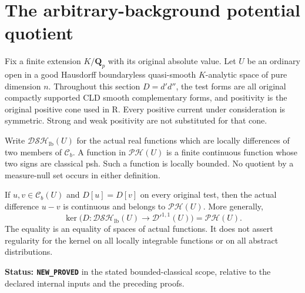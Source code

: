 \section{The arbitrary-background potential quotient}
\label{sec:r5-arbitrary-background-quotient}

Fix a finite extension $K/\mathbf Q_p$ with its original absolute
value. Let $U$ be an ordinary open in a good Hausdorff boundaryless
quasi-smooth $K$-analytic space of pure dimension $n$.
Throughout this section $D=d'd''$, the test forms are all original
compactly supported CLD smooth complementary forms, and positivity
is the original positive cone used in R. Every positive current
under consideration is symmetric. Strong and weak positivity are
not substituted for that cone.

Write $\mathscr{DSH}_{\mathrm{lb}}(U)$ for the actual real functions
which are locally differences of two members of $\mathcal C_b$.
A function in $\mathscr{PH}(U)$ is a finite continuous function
whose two signs are classical psh. Such a function is locally
bounded. No quotient by a measure-null set occurs in either
definition.

\begin{theorem}
\label{thm:r5-bounded-kernel-regularity}
If $u,v\in\mathcal C_b(U)$ and $D[u]=D[v]$ on every original
test, then the actual difference $u-v$ is continuous and belongs
to $\mathscr{PH}(U)$. More generally,
\[
 \ker\bigl(D:\mathscr{DSH}_{\mathrm{lb}}(U)
                   \longrightarrow\mathcal D'^{1,1}(U)\bigr)
                         =\mathscr{PH}(U).
\]
The equality is an equality of spaces of actual functions.
It does not assert regularity for the kernel on all locally
integrable functions or on all abstract distributions.
\end{theorem}

\noindent\textbf{Status: \texttt{NEW\_PROVED}} in the stated
bounded-classical scope, relative to the declared internal
inputs and the preceding proofs.

